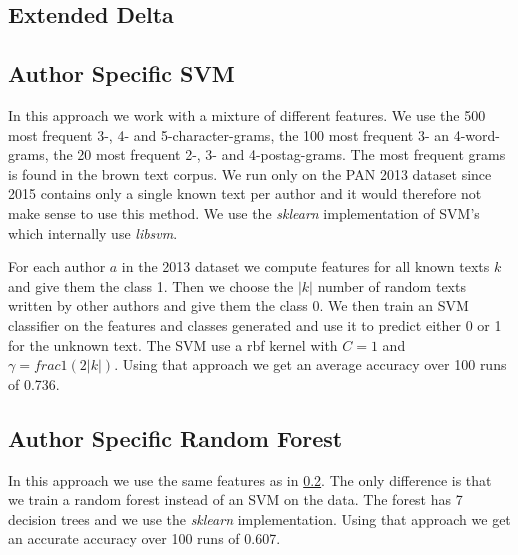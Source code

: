 \subsection{Extended Delta}

\subsection{Author Specific SVM} \label{subsec:author_specific_svm}
In this approach we work with a mixture of different features. We use the 500
most frequent 3-, 4- and 5-character-grams, the 100 most frequent 3- an
4-word-grams, the 20 most frequent 2-, 3- and 4-postag-grams. The most frequent
grams is found in the brown text corpus. We run only on the PAN 2013 dataset
since 2015 contains only a single known text per author and it would therefore
not make sense to use this method. We use the \textit{sklearn} implementation of
\gls{SVM}'s which internally use \textit{libsvm}.

For each author $a$ in the 2013 dataset we compute features for all known texts
$k$ and give them the class 1. Then we choose the $|k|$ number of random texts
written by other authors and give them the class 0. We then train an \gls{SVM}
classifier on the features and classes generated and use it to predict either 0
or 1 for the unknown text. The \gls{SVM} use a rbf kernel with $C=1$ and
$\gamma = frac{1}{(2|k|)}$. Using that approach we get an average accuracy over
100 runs of 0.736.

\subsection{Author Specific Random Forest}
In this approach we use the same features as in
\ref{subsec:author_specific_svm}. The only difference is that we train a random
forest instead of an \gls{SVM} on the data. The forest has 7 decision trees and
we use the \textit{sklearn} implementation. Using that approach we get an
accurate accuracy over 100 runs of 0.607.
